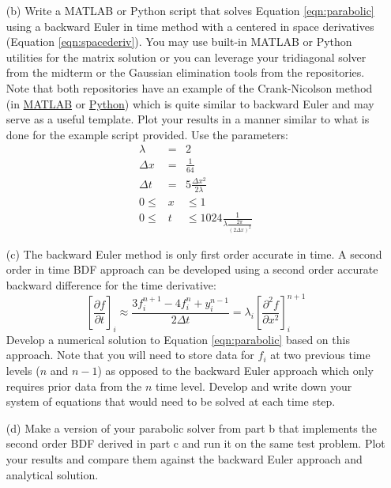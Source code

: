 \documentclass{article}
\begin{document}
\begin{enumerate}
\begin{enumerate}
    \item[(b)]  Write a MATLAB or Python script that solves Equation \ref{eqn:parabolic} using a backward Euler in time method with a centered in space derivatives (Equation \ref{eqn:spacederiv}).  You may use built-in MATLAB or Python utilities for the matrix solution or you can leverage your tridiagonal solver from the midterm or the Gaussian elimination tools from the repositories.  Note that both repositories have an example of the Crank-Nicolson method (in \href{https://github.com/Zettergren-Courses/EP501_matlab/blob/master/PDEs/parabolic.m}{MATLAB} or \href{https://github.com/Zettergren-Courses/EP501_matlab/blob/master/PDEs/parabolic.m}{Python}) which is quite similar to backward Euler and may serve as a useful template.  Plot your results in a manner similar to what is done for the example script provided.  Use the parameters:
    \begin{eqnarray}
      \lambda &=& 2 \\
      \Delta x &=& \frac{1}{64} \\
      \Delta t &=& 5 \frac{\Delta x^2}{2 \lambda} \\
      0 \le &x& \le 1 \\
      0 \le &t& \le 1024 \frac{1}{ \lambda \frac{2 \pi}{\left( 2 \Delta x \right)^2} }
    \end{eqnarray}
    \item[(c)]  The backward Euler method is only first order accurate in time.  A second order in time BDF approach can be developed using a second order accurate backward difference for the time derivative:
    \begin{equation}
      \left[ \frac{\partial f}{\partial t} \right]_i \approx \frac{3f_i^{n+1} - 4f_i^n + y_i^{n-1}}{2 \Delta t} =  \lambda_i \left[ \frac{\partial^2 f}{\partial x^2} \right]_i^{n+1}
    \end{equation}
    Develop a numerical solution to Equation \ref{eqn:parabolic} based on this approach.  Note that you will need to store data for $f_i$ at two previous time levels ($n$ and $n-1$) as opposed to the backward Euler approach which only requires prior data from the $n$ time level.  Develop and write down your system of equations that would need to be solved at each time step.  
    \item[(d)]  Make a version of your parabolic solver from part b that implements the second order BDF derived in part c and run it on the same test problem.  Plot your results and compare them against the backward Euler approach and analytical solution.  
  \end{enumerate}

    
\end{enumerate}
\end{document}
